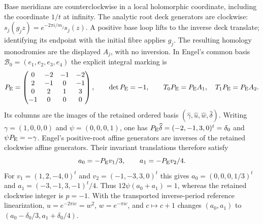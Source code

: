 Base meridians are counterclockwise in a local holomorphic coordinate,
including the coordinate $1/t$ at infinity. The analytic root deck
generators are clockwise: $s_j(g_jz)=e^{-2\pi i/m_j}s_j(z)$.
A positive base loop lifts to the inverse deck translate; identifying
its endpoint with the initial fibre applies $g_j$. The resulting
homology monodromies are the displayed $A_j$, with no inversion.
In Engel's common basis $\mathcal B_0=(e_1,e_2,e_3,e_4)$ the explicit
integral marking is
\[
P_{\rm E}=\begin{pmatrix}
0&-2&-1&-2\\2&-1&0&-1\\0&2&1&3\\-1&0&0&0
\end{pmatrix},\qquad \det P_{\rm E}=-1,
\qquad T_0P_{\rm E}=P_{\rm E}A_1,
\quad T_1P_{\rm E}=P_{\rm E}A_2.
\]
Its columns are the images of the retained ordered basis
$(\widehat\gamma,\widehat u,\widehat w,\widehat\delta)$.
Writing $\gamma=(1,0,0,0)$ and $\psi=(0,0,0,1)$, one has
$P_{\rm E}\widehat\delta=(-2,-1,3,0)^t=\delta_0$
and $\psi P_{\rm E}=-\gamma$.
Engel's positive-root affine generators are inverses of the retained
clockwise affine generators. Their invariant translations therefore
satisfy
\[
a_0=-P_{\rm E}v_1/3,\qquad a_1=-P_{\rm E}v_2/4.
\]
For $v_1=(1,2,-4,0)^t$ and $v_2=(-1,-3,3,0)^t$ this gives
$a_0=(0,0,0,1/3)^t$ and
$a_1=(-3,-1,3,-1)^t/4$.
Thus $12\psi(a_0+a_1)=1$, whereas the retained clockwise integer is
$p=-1$. With the transported inverse-period reference linearization,
$u=e^{-2\pi ic}=w^2$, $w=e^{-\pi ic}$, and $c\mapsto c+1$ changes
$(a_0,a_1)$ to $(a_0-\delta_0/3,a_1+\delta_0/4)$.
